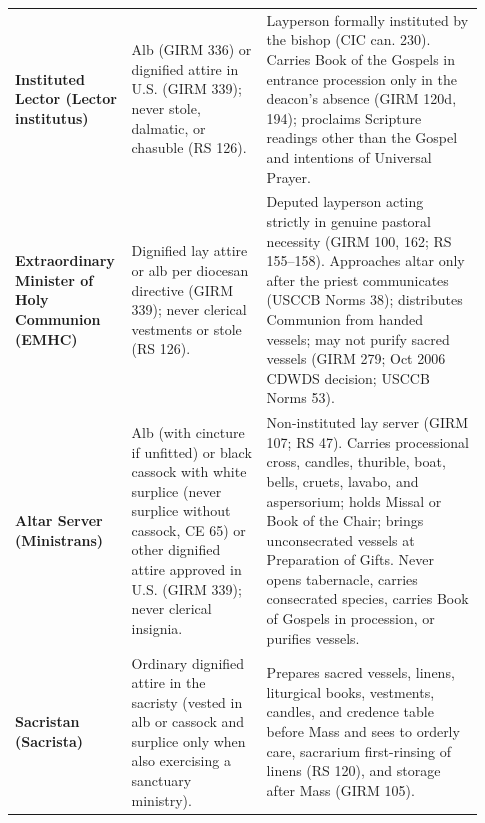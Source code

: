 {\begin{longtable}{>{\raggedright\arraybackslash}p{0.20\linewidth}>{\raggedright\arraybackslash}p{0.28\linewidth}>{\raggedright\arraybackslash}p{0.45\linewidth}}
\textbf{Instituted Lector (Lector institutus)} & Alb (GIRM 336) or dignified attire in U.S. (GIRM 339); never stole, dalmatic, or chasuble (RS 126). & Layperson formally instituted by the bishop (CIC can. 230). Carries Book of the Gospels in entrance procession only in the deacon's absence (GIRM 120d, 194); proclaims Scripture readings other than the Gospel and intentions of Universal Prayer. \\
\textbf{Extraordinary Minister of Holy Communion (EMHC)} & Dignified lay attire or alb per diocesan directive (GIRM 339); never clerical vestments or stole (RS 126). & Deputed layperson acting strictly in genuine pastoral necessity (GIRM 100, 162; RS 155--158). Approaches altar only after the priest communicates (USCCB Norms 38); distributes Communion from handed vessels; may not purify sacred vessels (GIRM 279; Oct 2006 CDWDS decision; USCCB Norms 53). \\
\textbf{Altar Server (Ministrans)} & Alb (with cincture if unfitted) or black cassock with white surplice (never surplice without cassock, CE 65) or other dignified attire approved in U.S. (GIRM 339); never clerical insignia. & Non-instituted lay server (GIRM 107; RS 47). Carries processional cross, candles, thurible, boat, bells, cruets, lavabo, and aspersorium; holds Missal or Book of the Chair; brings unconsecrated vessels at Preparation of Gifts. Never opens tabernacle, carries consecrated species, carries Book of Gospels in procession, or purifies vessels. \\
\textbf{Sacristan (Sacrista)} & Ordinary dignified attire in the sacristy (vested in alb or cassock and surplice only when also exercising a sanctuary ministry). & Prepares sacred vessels, linens, liturgical books, vestments, candles, and credence table before Mass and sees to orderly care, sacrarium first-rinsing of linens (RS 120), and storage after Mass (GIRM 105). \\
\bottomrule
\end{longtable}}

